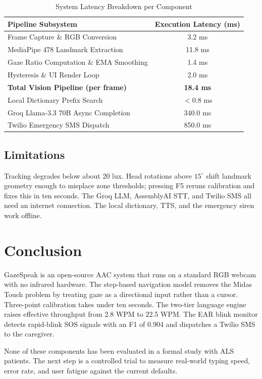 \documentclass[conference]{IEEEtran}
\begin{document}
\begin{table}[htbp]
\caption{System Latency Breakdown per Component}
\label{tab:latency_breakdown}
\centering
\begin{tabular}{lc}
\toprule
\textbf{Pipeline Subsystem} & \textbf{Execution Latency (ms)} \\
\midrule
Frame Capture \& RGB Conversion & 3.2 ms \\
MediaPipe 478 Landmark Extraction & 11.8 ms \\
Gaze Ratio Computation \& EMA Smoothing & 1.4 ms \\
Hysteresis \& UI Render Loop & 2.0 ms \\
\textbf{Total Vision Pipeline (per frame)} & \textbf{18.4 ms} \\
\midrule
Local Dictionary Prefix Search & $< 0.8$ ms \\
Groq Llama-3.3 70B Async Completion & 340.0 ms \\
Twilio Emergency SMS Dispatch & 850.0 ms \\
\bottomrule
\end{tabular}
\end{table}

\subsection{Limitations}
Tracking degrades below about 20 lux. Head rotations above $15^\circ$ shift landmark geometry
enough to misplace zone thresholds; pressing F5 reruns calibration and fixes this in ten
seconds. The Groq LLM, AssemblyAI STT, and Twilio SMS all need an internet connection. The
local dictionary, TTS, and the emergency siren work offline.

\section{Conclusion}
GazeSpeak is an open-source AAC system that runs on a standard RGB webcam with no infrared
hardware. The step-based navigation model removes the Midas Touch problem by treating gaze as
a directional input rather than a cursor. Three-point calibration takes under ten seconds.
The two-tier language engine raises effective throughput from 2.8 WPM to 22.5 WPM. The EAR
blink monitor detects rapid-blink SOS signals with an F1 of 0.904 and dispatches a Twilio SMS
to the caregiver.

None of these components has been evaluated in a formal study with ALS patients. The next
step is a controlled trial to measure real-world typing speed, error rate, and user fatigue
against the current defaults.
\end{document}
